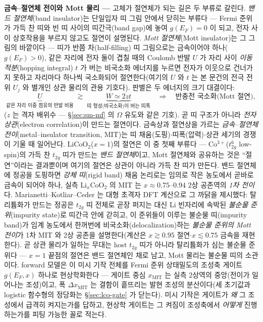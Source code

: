 \begin{bgbox}
\textbf{금속--절연체 전이와 Mott 물리 ---} 고체가 절연체가 되는 길은 두 부류로 갈린다.
\emph{밴드 절연체}(band insulator)는 단일입자 띠 그림 안에서 닫히는 부류다 --- Fermi 준위가 가득 찬 띠와
빈 띠 사이의 띠간극(band gap)에 놓여 $g(E_F){=}0$ 이 되고, 전자 사이 상호작용을 부르지 않고도 절연이
설명된다. \emph{Mott 절연체}(Mott insulator)는 그 그림의 바깥이다 --- 띠가 반쯤 차(half-filling) 띠
그림으로는 금속이어야 하나($g(E_F){>}0$), 같은 자리에 전자 둘이 겹칠 때의 Coulomb 반발 $U$ 가 자리 사이
\emph{이동적분}(hopping integral) $t$ 가 버는 비국소화 에너지를 누르면 전자가 이웃으로 건너가지 못하고
자리마다 하나씩 국소화되어 절연한다(여기의 $U$ 와 $t$ 는 본 문건의 전극 전위 $U_j$ 와 별개인 상관 물리의
관용 기호다). 판별은 두 에너지의 크기 대결이다:
\begin{equation}
\underbrace{U}_{\text{같은 자리 이중 점유의 반발 비용}}
\;\gtrsim\;
\underbrace{W\simeq 2zt}_{\text{띠 형성(비국소화)이 버는 띠폭}}
\quad\Longrightarrow\quad
\text{반충전 국소화(Mott 절연)},
\label{eq:lco-mottcrit}
\end{equation}
($z$ 는 격자 배위수 --- \S\ref{sec:sm-mf} 의 $\Omega$ 유도와 같은 기호). 곧 띠 구조가
아니라 \emph{전자 상관}(electron correlation)이 만드는 절연이다\cite{mott1968,imada1998}. 금속상과 절연상을
가르는 \emph{금속--절연체 전이}(metal--insulator transition, MIT)는 띠 채움(도핑)$\cdot$띠폭(압력)$\cdot$상관
세기의 경쟁이 기울 때 일어난다\cite{imada1998}. $\mathrm{LiCoO_2}$($x{=}1$)의 절연은 이 중 첫째 부류다 ---
Co$^{3+}$($t_{2g}^6$ low-spin)의 가득 찬 $t_{2g}$ 띠가 만드는 \emph{밴드 절연체}이고\cite{menetrier1999},
Mott 절연체와 공유하는 것은 ``절연''이라는 결과뿐이며 여기의 절연은 상관이 아니라 가득 찬 띠가 만든다.
밴드 절연체에 정공을 도핑하면 \emph{강체 띠}(rigid band) 채움 논리로는 임의로 작은 농도에서 곧바로 금속이 되어야 하나, 실측
$\mathrm{Li}_x\mathrm{CoO_2}$ 의 MIT 는 $x\approx0.75$--$0.94$ 2상 공존역의 \emph{1차
전이}다\cite{menetrier1999,reimers1992,motohashi2009}. Marianetti--Kotliar--Ceder 는 대형 초격자 DFT 계산으로
그 까닭을 제시했다: 탈리튬화가 만드는 정공은 $t_{2g}$ 띠 전체로 곧장 퍼지는 대신 Li 빈자리에 속박된
\emph{불순물 준위}(impurity state)로 띠간극 안에 갇히고, 이 준위들이 이루는 불순물 띠(impurity band)가 임계
농도에서 한꺼번에 비국소화(delocalization)하는 \emph{불순물 준위의 Mott 전이}가 1차 MIT 와 2상 공존을
설명한다\cite{marianetti2004}(계산은 $x\gtrsim0.95$ 절연$\cdot$$x\lesssim0.75$ 금속을 재현한다). 곧 상관
물리가 일하는 무대는 host $t_{2g}$ 띠가 아니라 탈리튬화가 심는 불순물 준위다 --- $x{=}1$ 끝점의 절연은 밴드
절연체인 채로 남고, Mott 물리는 불순물 띠의 소관이다. forward 모델은 이 미시 기작 전체를 Fermi 준위
상태밀도의 조성축 게이트 $g(E_F,x)$ 하나로 현상학화한다 --- 게이트 중심 $x_\mathrm{MIT}$ 는 실측 2상역의
중앙(전이가 일어나는 조성)이고, 폭 $\Delta x_\mathrm{MIT}$ 는 결함이 흩뜨리는 발현 조성의 분산이다(세
초기값과 logistic 함수형의 정당화는 \S\ref{sec:lco-gate} 가 닫는다). 미시 기작은 게이트가 \emph{왜} 그
조성에서 급격히 켜지는가를 답하고, 현상학 게이트는 그 켜짐이 조성축에서 \emph{어떻게} 진행하는가를 피팅
가능한 꼴로 적는다.
\end{bgbox}

